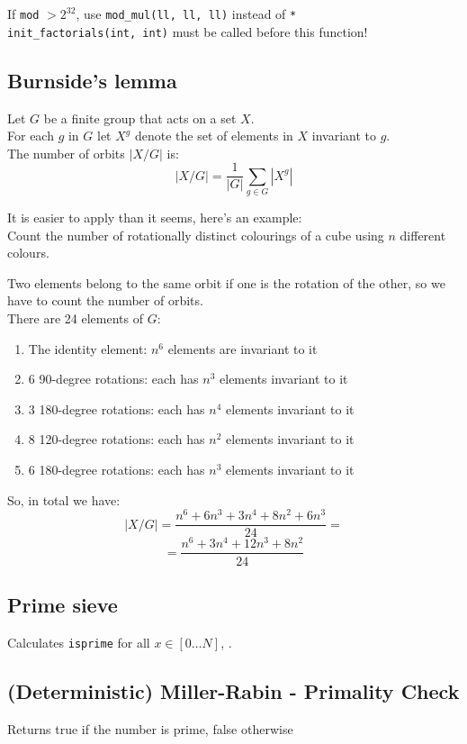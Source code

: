 If \verb|mod| $> 2^{32}$, use \verb|mod_mul(ll, ll, ll)| instead of \verb|*| \\
\verb|init_factorials(int, int)| must be called before this function!


\subsection{Burnside's lemma}
Let $G$ be a finite group that acts on a set $X$. \\
For each $g$ in $G$ let $X^g$ denote the set of elements in $X$ invariant to $g$. \\
The number of orbits $|X / G|$ is:
\[|X / G| = \frac{1}{|G|} \sum_{g \in G}|X^g|\]

It is easier to apply than it seems, here's an example: \\
Count the number of rotationally distinct colourings of a cube using $n$ different colours.

Two elements belong to the same orbit if one is the rotation of the other,
so we have to count the number of orbits. \\
There are 24 elements of $G$:

\begin{enumerate}
	\item The identity element: $n^6$ elements are invariant to it
	\item 6 90-degree rotations: each has $n^3$ elements invariant to it
	\item 3 180-degree rotations: each has $n^4$ elements invariant to it
	\item 8 120-degree rotations: each has $n^2$ elements invariant to it
	\item 6 180-degree rotations: each has $n^3$ elements invariant to it
\end{enumerate}

So, in total we have:
\[|X / G| = \frac{n^6 + 6n^3 + 3n^4 + 8n^2 + 6n^3}{24} = \]
\[= \frac{n^6 + 3n^4 + 12n^3 + 8n^2}{24}\]


\subsection{Prime sieve}
Calculates \verb|isprime| for all $x \in [0 \ldots N]$, .

\subsection{(Deterministic) Miller-Rabin - Primality Check}
Returns true if the number is prime, false otherwise


